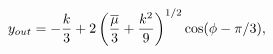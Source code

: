 \begin{equation}
y_{out}=-\frac{k}{3}+2\left(\frac{\overline{\mu}}{3}+
\frac{k^2}{9}\right)^{1/2}\cos(\phi-\pi/3)\\,
\end{equation}

